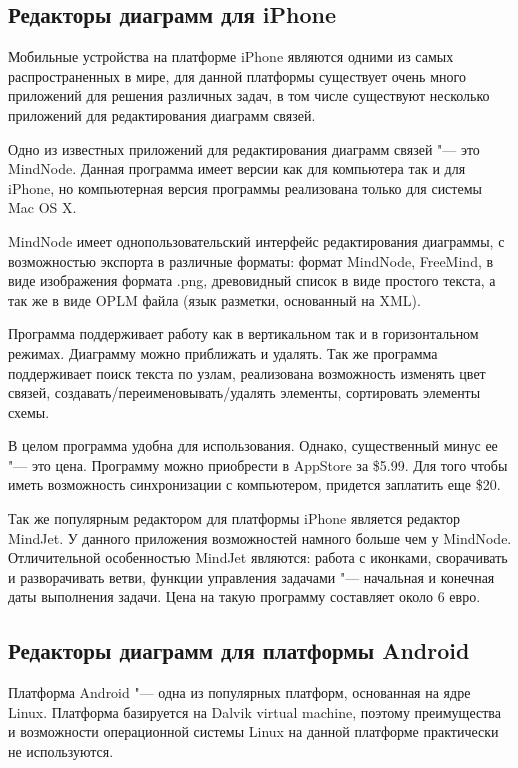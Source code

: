 \subsection{Редакторы диаграмм для iPhone}

Мобильные устройства на платформе iPhone являются одними из самых распространенных в мире, для данной платформы существует очень много приложений для решения различных задач, в том числе существуют несколько приложений для редактирования диаграмм связей.

Одно из известных приложений для редактирования диаграмм связей "--- это MindNode. Данная программа имеет версии как для компьютера так и для iPhone, но компьютерная версия программы реализована только для системы Mac OS X.

MindNode имеет однопользовательский интерфейс редактирования диаграммы, с возможностью экспорта в различные форматы: формат MindNode, FreeMind, в виде изображения формата .png, древовидный список в виде простого текста, а так же в виде OPLM файла (язык разметки, основанный на XML).

Программа поддерживает работу как в вертикальном так и в горизонтальном режимах. Диаграмму можно приближать и удалять. Так же программа поддерживает поиск текста по узлам, реализована возможность изменять цвет связей, создавать/переименовывать/удалять элементы, сортировать элементы схемы.

В целом программа удобна для использования. Однако, существенный минус ее "--- это цена. Программу можно приобрести в AppStore за \$5.99. Для того чтобы иметь возможность синхронизации с компьютером, придется заплатить еще \$20.

Так же популярным редактором для платформы iPhone является редактор MindJet. У данного приложения возможностей намного больше чем у MindNode. Отличительной особенностью MindJet являются: работа с иконками, сворачивать и разворачивать ветви, функции управления задачами "--- начальная и конечная даты выполнения задачи. Цена на такую программу составляет около 6 евро.

\subsection{Редакторы диаграмм для платформы Android}

Платформа Android "--- одна из популярных платформ, основанная на ядре Linux. Платформа базируется на Dalvik virtual machine, поэтому преимущества и возможности операционной системы Linux на данной платформе практически не используются.

